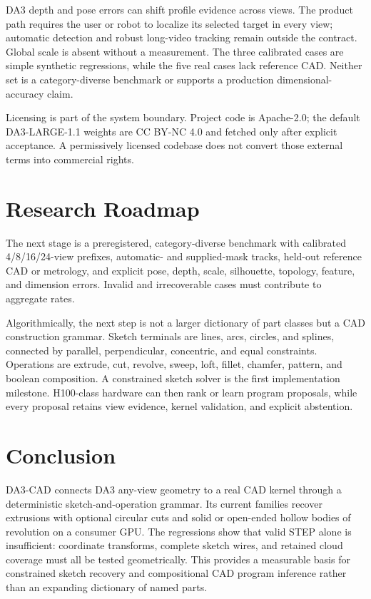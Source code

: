 \documentclass[10pt]{article}
\newcommand{\system}{DA3-CAD}
\newcommand{\da}{DA3-LARGE-1.1}
\begin{document}
DA3 depth and pose errors can shift profile evidence across views.  The product
path requires the user or robot to localize its selected target in every view;
automatic detection and robust long-video tracking remain outside the contract.
Global scale is absent without a measurement.  The three calibrated cases are
simple synthetic regressions, while the five real cases lack reference CAD.
Neither set is a category-diverse benchmark or supports a production
dimensional-accuracy claim.

Licensing is part of the system boundary.  Project code is Apache-2.0; the
default \da{} weights are CC BY-NC 4.0 and fetched only after explicit
acceptance.  A permissively licensed codebase does not convert those external
terms into commercial rights.

\section{Research Roadmap}

The next stage is a preregistered, category-diverse benchmark with calibrated
4/8/16/24-view prefixes, automatic- and supplied-mask tracks, held-out reference
CAD or metrology, and explicit pose, depth, scale, silhouette, topology,
feature, and dimension errors.  Invalid and irrecoverable cases must contribute
to aggregate rates.

Algorithmically, the next step is not a larger dictionary of part classes but a
CAD construction grammar.  Sketch terminals are lines, arcs, circles, and
splines, connected by parallel, perpendicular, concentric, and equal
constraints.  Operations are extrude, cut, revolve, sweep, loft, fillet,
chamfer, pattern, and boolean composition.  A constrained sketch solver is the
first implementation milestone.  H100-class hardware can then rank or learn
program proposals, while every proposal retains view evidence, kernel
validation, and explicit abstention.

\section{Conclusion}

\system{} connects DA3 any-view geometry to a real CAD kernel through a
deterministic sketch-and-operation grammar.  Its current families recover
extrusions with optional circular cuts and solid or open-ended hollow bodies of
revolution on a consumer GPU.  The regressions show that valid STEP alone is
insufficient: coordinate transforms, complete sketch wires, and retained cloud
coverage must all be
tested geometrically.  This provides a measurable basis for constrained sketch
recovery and compositional CAD program inference rather than an expanding
dictionary of named parts.
\end{document}
